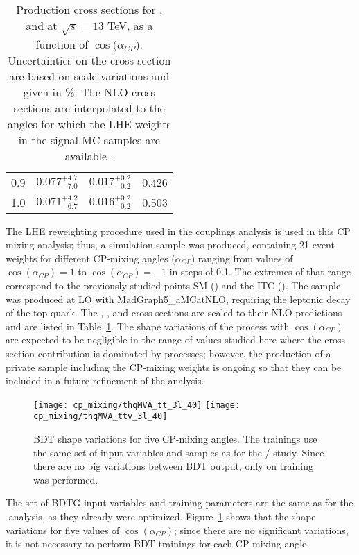 \begin{table}[h!]
\begin{tabular}{lccc}
    0.9              & $0.077^{+4.7}_{-7.0}$ & $0.017^{+0.2}_{-0.2}$ & 0.426  \\
    1.0              & $0.071^{+4.2}_{-6.7}$ & $0.016^{+0.2}_{-0.2}$ & 0.503  \\\hline
\end{tabular}
  \caption[Cross sections for \tHq, \tHW and \ttH as a function of $\cos(\alpha_{CP})$ ]{Production cross sections for \tHq, \tHW and \ttH at $\sqrt{s}=13$ TeV, as a function of $\cos(\alpha_{CP}$). Uncertainties on the cross section are based on scale variations and given in \%. The \ttH NLO cross sections are interpolated to the angles for which the LHE weights in the signal MC samples are available \cite{fink}.}\label{tab:cp_signal_xsec}
\end{table}

The LHE reweighting procedure used in the couplings analysis is used in this CP mixing analysis; thus, a \tXq simulation sample was produced, containing 21 event weights for different CP-mixing angles ($\alpha_{CP}$) ranging from values of $\cos (\alpha_{CP}) = 1$ to $\cos (\alpha_{CP}) = -1$ in steps of 0.1. The extremes of that range correspond to the previously studied points SM () and the ITC (). The sample was produced at LO with MadGraph5\_aMCatNLO, requiring the leptonic decay of the top quark. The \tHq, \tHW, and \ttH cross sections are scaled to their NLO predictions and are listed in Table~\ref{tab:cp_signal_xsec}. The shape variations of the \ttH process with $\cos (\alpha_{CP})$ are expected to be negligible in the range of values studied here where the cross section contribution is dominated by \tH processes; however, the production of a private \ttH sample including the CP-mixing weights is ongoing so that they can be included in a future refinement of the analysis.  

\begin{figure} [!h]
      \centering
      \texttt{[image: cp\_mixing/thqMVA\_tt\_3l\_40]}
      \texttt{[image: cp\_mixing/thqMVA\_ttv\_3l\_40]}
      \caption[BDT shape variations for five CP-mixing angles.]{BDT shape variations for five CP-mixing angles. The trainings use the same set of input variables and samples as for the \Ct/-\CV study. Since there are no big variations between BDT output, only on training was performed.}
\label{fig:bdtg_output_5cp}
\end{figure}

The set of BDTG input variables and training parameters are the same as for the \Ct-\CV analysis, as they already were optimized. Figure~\ref{fig:bdtg_output_5cp} shows that the shape variations for five values of $\cos (\alpha_{CP})$; since there are no significant variations, it is not necessary to perform BDT trainings for each CP-mixing angle.    

